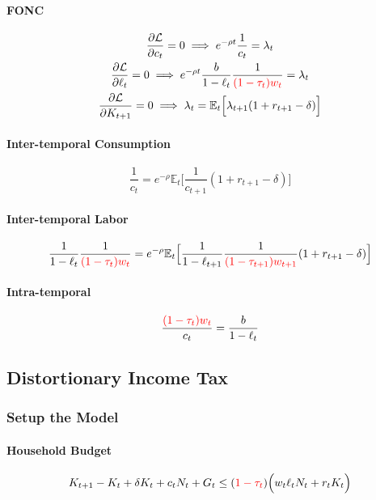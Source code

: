 \documentclass[11pt]{article}
\newcommand{\expat}[2]{\mathbb{E}_{#1}\Big[{#2}\Big]}
\begin{document}
			\paragraph{FONC}
				\begin{gather}
					\pd{\mc{L}}{c_t} = 0
					\implies e^{-\rho t} \frac{1}{c_t} = \lambda_t \\
					\pd{\mc{L}}{\ell_t} = 0
					\implies e^{-\rho t} \frac{b}{1 - \ell_t} \frac{1}{\textcolor{red}{(1 - \tau_t)w_t}} = \lambda_t \\
					\pd{\mc{L}}{K_{t+1}} = 0 \implies \lambda_t = \expat{t}{\lambda_{t+1} (1 + r_{t+1} - \delta)}
				\end{gather}
			\paragraph{Inter-temporal Consumption}
				\begin{equation}
					\frac{1}{c_t} = e^{-\rho} \expat{t}{
						\frac{1}{c_{t+1}} (1 + r_{t+1} - \delta)
					}
				\end{equation}
				
			\paragraph{Inter-temporal Labor}
				\begin{equation}
					\frac{1}{1 - \ell_t} \frac{1}{\textcolor{red}{(1 - \tau_t)w_t}} = e^{-\rho} \expat{t}{
							\frac{1}{1 - \ell_{t+1}}\frac{1}{\textcolor{red}{(1 - \tau_{t+1}) w_{t+1}}} (1 + r_{t+1} - \delta)
							}
				\end{equation}
				
			\paragraph{Intra-temporal}
				\begin{equation}
					\frac{\textcolor{red}{(1-\tau_t)w_t}}{c_t} = \frac{b}{1-\ell_t}
				\end{equation}
		
		\subsection{Distortionary Income Tax}
			\subsubsection{Setup the Model}
			\paragraph{Household Budget}
				\begin{equation}
					K_{t+1} - K_t + \delta K_t + c_t N_t + G_t \leq (\textcolor{red}{1-\tau_t}) \Big( w_t \ell_t N_t + r_t K_t \Big)
				\end{equation}
				
\end{document}

